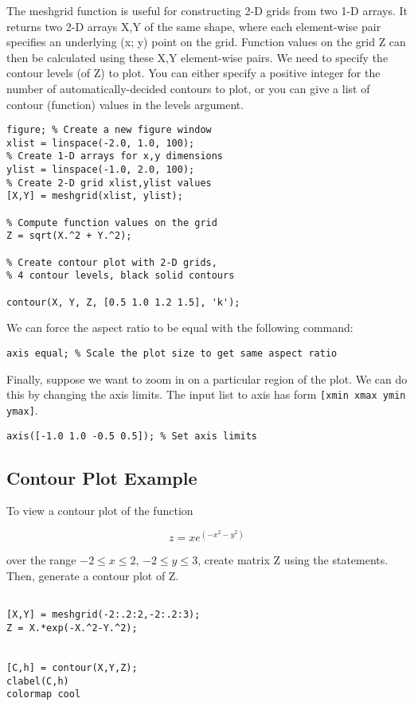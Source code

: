 \documentclass[12pt]{article}
\begin{document}
The meshgrid function is useful for constructing 2-D grids from two 1-D arrays. It returns two 2-D arrays
X,Y of the same shape, where each element-wise pair specifies an underlying (x; y) point on the grid. Function
values on the grid Z can then be calculated using these X,Y element-wise pairs.
We need to specify the contour levels (of Z) to plot. You can either specify a positive integer for the
number of automatically-decided contours to plot, or you can give a list of contour (function) values in the levels argument.
\begin{framed}
\begin{verbatim}
figure; % Create a new figure window
xlist = linspace(-2.0, 1.0, 100);
% Create 1-D arrays for x,y dimensions
ylist = linspace(-1.0, 2.0, 100);
% Create 2-D grid xlist,ylist values
[X,Y] = meshgrid(xlist, ylist);

% Compute function values on the grid
Z = sqrt(X.^2 + Y.^2);

% Create contour plot with 2-D grids,
% 4 contour levels, black solid contours

contour(X, Y, Z, [0.5 1.0 1.2 1.5], 'k');
\end{verbatim}
\end{framed}
We can force the
aspect ratio to be equal with the following command:
\begin{verbatim}
axis equal; % Scale the plot size to get same aspect ratio
\end{verbatim}
Finally, suppose we want to zoom in on a particular region of the plot. We can do this by changing the
axis limits. The input list to axis has form \texttt{[xmin xmax ymin ymax]}.
\begin{verbatim}
axis([-1.0 1.0 -0.5 0.5]); % Set axis limits
\end{verbatim}

\subsection{Contour Plot Example}
To view a contour plot of the function

\[z = xe^{(-x^2-y^2)}\]

\noindent over the range $-2 \leq x \leq  2$, $-2 \leq  y \leq  3$, create matrix Z using the statements. Then, generate a contour plot of Z.
\begin{framed}
\begin{verbatim}

[X,Y] = meshgrid(-2:.2:2,-2:.2:3);
Z = X.*exp(-X.^2-Y.^2);


[C,h] = contour(X,Y,Z);
clabel(C,h)
colormap cool
\end{verbatim}
\end{framed}
\end{document}
